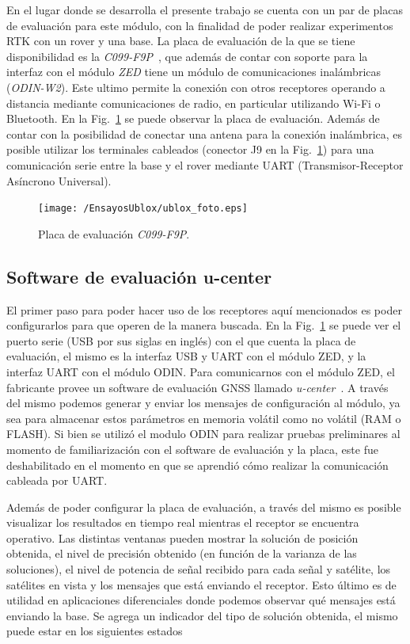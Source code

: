 \documentclass[a4paper,12pt,oneside,onecolumn,final,openright]{book}%
\begin{document}
	En el lugar donde se desarrolla el presente trabajo se cuenta con un par de placas de evaluación para este módulo, con la finalidad de poder realizar experimentos RTK con un rover y una base. La placa de evaluación de la que se tiene disponibilidad es la \textit{C099-F9P}~\cite{C099_ds}, que además de contar con soporte para la interfaz con el módulo \textit{ZED} tiene un módulo de comunicaciones inalámbricas (\textit{ODIN-W2}). Este ultimo permite la conexión con otros receptores operando a distancia mediante comunicaciones de radio, en particular utilizando Wi-Fi o Bluetooth. En la Fig.~\ref{fig:EvBoard} se puede observar la placa de evaluación. Además de contar con la posibilidad de conectar una antena para la conexión inalámbrica, es posible utilizar los terminales cableados (conector J9 en la Fig.~\ref{fig:EvBoard}) para una comunicación serie entre la base y el rover mediante UART (Transmisor-Receptor Asíncrono Universal).
	
\begin{figure}
    \centering
    \texttt{[image: /EnsayosUblox/ublox\_foto.eps]}
    \caption{Placa de evaluación \textit{C099-F9P}.}
    \label{fig:EvBoard}
\end{figure}
\subsection{Software de evaluación u-center}\label{sec:ucenter}
	El primer paso para poder hacer uso de los receptores aquí mencionados es poder configurarlos para que operen de la manera buscada. En la Fig.~\ref{fig:EvBoard} se puede ver el puerto serie (USB por sus siglas en inglés) con el que cuenta la placa de evaluación, el mismo es la interfaz USB y UART con el módulo ZED, y la interfaz UART con el módulo ODIN. Para comunicarnos con el módulo ZED, el fabricante provee un software de evaluación GNSS llamado \textit{u-center}~\cite{u_center}. A través del mismo podemos generar y enviar los mensajes de configuración al módulo, ya sea para almacenar estos parámetros en memoria volátil como no volátil (RAM o FLASH). Si bien se utilizó el modulo ODIN para realizar pruebas preliminares al momento de familiarización con el software de evaluación y la placa, este fue deshabilitado en el momento en que se aprendió cómo realizar la comunicación cableada por UART.
	
	Además de poder configurar la placa de evaluación, a través del mismo es posible visualizar los resultados en tiempo real mientras el receptor se encuentra operativo. Las distintas ventanas pueden mostrar la solución de posición obtenida, el nivel de precisión obtenido (en función de la varianza de las soluciones), el nivel de potencia de señal recibido para cada señal y satélite, los satélites en vista y los mensajes que está enviando el receptor. Esto último es de utilidad en aplicaciones diferenciales donde podemos observar qué mensajes está enviando la base. Se agrega un indicador del tipo de solución obtenida, el mismo puede estar en los siguientes estados
\end{document}
